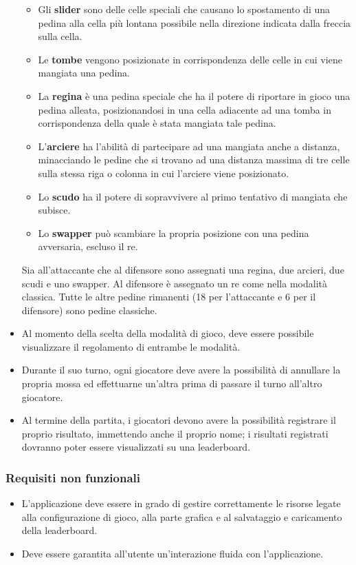 \documentclass[a4paper,12pt]{report}
\begin{document}
\begin{itemize}
	\begin{itemize}
		\item Gli \textbf{slider} sono delle celle speciali che causano lo spostamento di una pedina alla cella più lontana possibile nella direzione indicata dalla freccia sulla cella.
		\item Le \textbf{tombe} vengono posizionate in corrispondenza delle celle in cui viene mangiata una pedina.
		\item La \textbf{regina} è una pedina speciale che ha il potere di riportare in gioco una pedina alleata, posizionandosi in una cella adiacente ad una tomba in corrispondenza della quale è stata mangiata tale pedina.
		\item L'\textbf{arciere} ha l'abilità di partecipare ad una mangiata anche a distanza, minacciando le pedine che si trovano ad una distanza massima di tre celle sulla stessa riga o colonna in cui l'arciere viene posizionato.
		\item Lo \textbf{scudo} ha il potere di sopravvivere al primo tentativo di mangiata che subisce.
		\item Lo \textbf{swapper} può scambiare la propria posizione con una pedina avversaria, escluso il re.
	\end{itemize}
	Sia all'attaccante che al difensore sono assegnati una regina, due arcieri, due scudi e uno swapper. Al difensore è assegnato un re come nella modalità classica. Tutte le altre pedine rimanenti (18 per l'attaccante e 6 per il difensore) sono pedine classiche.
	
	\item Al momento della scelta della modalità di gioco, deve essere possibile visualizzare il regolamento di entrambe le modalità.
	\item Durante il suo turno, ogni giocatore deve avere la possibilità di annullare la propria mossa ed effettuarne un'altra prima di passare il turno all'altro giocatore.
	\item Al termine della partita, i giocatori devono avere la possibilità registrare il proprio risultato, immettendo anche il proprio nome; i risultati registrati dovranno poter essere visualizzati su una leaderboard.
\end{itemize}

\subsubsection{Requisiti non funzionali}

\begin{itemize}
	\item L'applicazione deve essere in grado di gestire correttamente le risorse legate alla configurazione di gioco, alla parte grafica e al salvataggio e caricamento della leaderboard.
	\item Deve essere garantita all'utente un'interazione fluida con l'applicazione.
\end{itemize}
\end{document}

